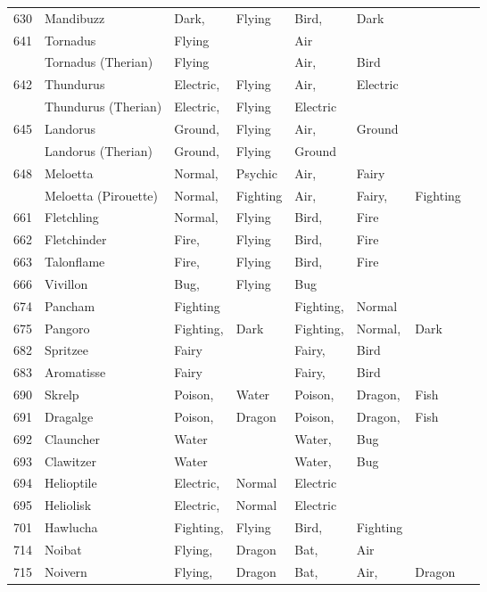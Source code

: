 \documentclass{article}
\begin{document}
\begin{longtable}{rl|ll|llll}
630 & Mandibuzz & Dark, & Flying & Bird, & Dark &  &  \\
641 & Tornadus & Flying &  & Air &  &  &  \\
    & Tornadus (Therian) & Flying &  & Air, & Bird &  &  \\
642 & Thundurus & Electric, & Flying & Air, & Electric &  &  \\
    & Thundurus (Therian) & Electric, & Flying & Electric &  &  &  \\
645 & Landorus & Ground, & Flying & Air, & Ground &  &  \\
    & Landorus (Therian) & Ground, & Flying & Ground &  &  &  \\
648 & Meloetta & Normal, & Psychic & Air, & Fairy &  &  \\
    & Meloetta (Pirouette) & Normal, & Fighting & Air, & Fairy, & Fighting &  \\
\hline %
661 & Fletchling & Normal, & Flying & Bird, & Fire &  &  \\
662 & Fletchinder & Fire, & Flying & Bird, & Fire &  &  \\
663 & Talonflame & Fire, & Flying & Bird, & Fire &  &  \\
666 & Vivillon & Bug, & Flying & Bug &  &  &  \\
674 & Pancham & Fighting &  & Fighting, & Normal &  &  \\
675 & Pangoro & Fighting, & Dark & Fighting, & Normal, & Dark &  \\
682 & Spritzee & Fairy &  & Fairy, & Bird &  &  \\
683 & Aromatisse & Fairy &  & Fairy, & Bird &  &  \\
690 & Skrelp & Poison, & Water & Poison, & Dragon, & Fish &  \\
691 & Dragalge & Poison, & Dragon & Poison, & Dragon, & Fish &  \\
692 & Clauncher & Water &  & Water, & Bug &  &  \\
693 & Clawitzer & Water &  & Water, & Bug &  &  \\
694 & Helioptile & Electric, & Normal & Electric &  &  &  \\
695 & Heliolisk & Electric, & Normal & Electric &  &  &  \\
701 & Hawlucha & Fighting, & Flying & Bird, & Fighting &  \\
714 & Noibat & Flying, & Dragon & Bat, & Air &  &  \\
715 & Noivern & Flying, & Dragon & Bat, & Air, & Dragon &  \\

\end{longtable}
\end{document}
